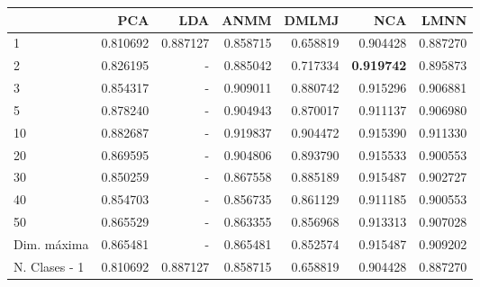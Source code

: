 \begin{tabular}{lrrrrrr}
\toprule
{} &       PCA &       LDA &      ANMM &     DMLMJ &       NCA &      LMNN \\
\midrule
1             &  0.810692 &  0.887127 &  0.858715 &  0.658819 &  0.904428 &  0.887270 \\
2             &  0.826195 &  -        &  0.885042 &  0.717334 &  \textbf{0.919742} &  0.895873 \\
3             &  0.854317 &  -        &  0.909011 &  0.880742 &  0.915296 &  0.906881 \\
5             &  0.878240 &  -        &  0.904943 &  0.870017 &  0.911137 &  0.906980 \\
10            &  0.882687 &  -        &  0.919837 &  0.904472 &  0.915390 &  0.911330 \\
20            &  0.869595 &  -        &  0.904806 &  0.893790 &  0.915533 &  0.900553 \\
30            &  0.850259 &  -        &  0.867558 &  0.885189 &  0.915487 &  0.902727 \\
40            &  0.854703 &  -        &  0.856735 &  0.861129 &  0.911185 &  0.900553 \\
50            &  0.865529 &  -        &  0.863355 &  0.856968 &  0.913313 &  0.907028 \\
Dim. máxima   &  0.865481 &  -        &  0.865481 &  0.852574 &  0.915487 &  0.909202 \\
N. Clases - 1 &  0.810692 &  0.887127 &  0.858715 &  0.658819 &  0.904428 &  0.887270 \\
\bottomrule
\end{tabular}
